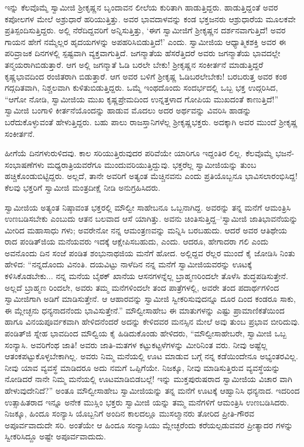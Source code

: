 ಇನ್ನು ಕೆಲವೊಮ್ಮೆ ಸ್ವಾಮೀಜಿ ಶ್ರೀಕೃಷ್ಣನ ಬೃಂದಾವನ ಲೀಲೆಯ ಕುರಿತಾಗಿ ಹಾಡುತ್ತಿದ್ದರು. ಹಾಡುತ್ತಿದ್ದಂತೆ ಅವರ ಕಪೋಲಗಳ ಮೇಲೆ ಅಶ್ರುಧಾರೆ ಹರಿಯುತ್ತಿತ್ತು. ಅವರ ಭಾವದಾಳವನ್ನು ಕಂಡ ಭಕ್ತಜನರು ಆಶ್ರುಧಾರೆಯ ಮೂಲಕವೇ ಪ್ರತಿಸ್ಪಂದಿಸುತ್ತಿದ್ದರು. ಅಲ್ಲಿ ನೆರೆದಿದ್ದವರಿಗೆ ಅನ್ನಿಸುತ್ತಿತ್ತು, ‘ಈಗ ಸ್ವಾಮೀಜಿಗೆ ಶ್ರೀಕೃಷ್ಣನ ದರ್ಶನವಾಗುತ್ತಿದೆ! ಅವರ ಗಾಯನ ಹೇಗೆ ನಮ್ಮೆಲ್ಲರ ಹೃದಯಗಳನ್ನು ಅಪಹರಿಸಿಬಿಡುತ್ತಿದೆ!’ ಎಂದು. ಸ್ವಾಮೀಜಿಯ ಆಧ್ಯಾತ್ಮಿಕಶಕ್ತಿ ಅವರ ಈ ಪರಿವ್ರಾಜಕ ದಿನಗಳಲ್ಲಿ ಸ್ಪಷ್ಟವಾಗಿ ವ್ಯಕ್ತವಾಗುತ್ತಿದೆ. ಜಗನ್ಮಾತೆಯ ಹೆಸರೆತ್ತಿದರೆ ಅವರು ಜಗನ್ಮಾತೆಯ ಭಾವದಲ್ಲೇ ತನ್ಮಯರಾಗಿಬಿಡುತ್ತಾರೆ. ಆಗ ಅಲ್ಲಿ ಜಗನ್ಮಾತೆ ಓಡಿ ಬರಲೇ ಬೇಕು! ಶ್ರೀಕೃಷ್ಣನ ಸಂಕೀರ್ತನೆ ಮಾಡುತ್ತಿದ್ದರೆ ಕೃಷ್ಣಭಾವದಿಂದ ರಂಜಿತರಾಗಿ ಬಿಡುತ್ತಾರೆ. ಆಗ ಅವರ ಬಳಿಗೆ ಶ್ರೀಕೃಷ್ಣ ಓಡಿಬರಲೇಬೇಕು! ಬರಬರುತ್ತ ಅವರ ಕಂಠ ಗದ್ಗದಿತವಾಗಿ, ನಿಶ್ಚಲವಾಗಿ ಕುಳಿತುಬಿಡುತ್ತಿದ್ದರು. ಒಮ್ಮೆ ಇಂಥದೊಂದು ಸಂದರ್ಭದಲ್ಲಿ ಒಬ್ಬ ಭಕ್ತ ಉದ್ಗರಿಸಿದ, “ಆಗೋ ನೋಡಿ, ಸ್ವಾಮೀಜಿಯ ಮುಖ ಕೃಷ್ಣಪ್ರೇಮದಿಂದ ಉನ್ನತ್ತಳಾದ ಗೋಪಿಯ ಮುಖದಂತೆ ಕಾಣುತ್ತಿದೆ!” ಸ್ವಾಮೀಜಿ ಬಂಗಾಳಿ ಕೀರ್ತನೆಯೊಂದನ್ನು ಹಾಡುವ ಮೊದಲು ಅದರ ಅರ್ಥವನ್ನು ವಿವರಿಸಿ ಹಾಡನ್ನು ಬರೆದುಕೊಳ್ಳುವಂತೆ ಹೇಳುತ್ತಿದ್ದರು. ಬಹು ಪಾಲು ರಾಜಸ್ತಾನಿಗಳೆಲ್ಲ ಶ್ರೀಕೃಷ್ಣಭಕ್ತರು. ಅದಕ್ಕಾಗಿ ಅವರ ಮುಂದೆ ಶ್ರೀಕೃಷ್ಣ ಸಂಕೀರ್ತನೆ.

ಹೀಗೆಯೆ ದಿನಗಳುರುಳಿದವು. ಕಾಲ ಸರಿಯುತ್ತಿರುವುದರ ಪರಿವೆಯೇ ಯಾರಿಗೂ ಇದ್ದಂತಿರ ಲಿಲ್ಲ. ಕೆಲವೊಮ್ಮೆ ಭಜನೆ-ಸಂಭಾಷಣೆಗಳು ಮಧ್ಯರಾತ್ರಿಯವರೆಗೂ ಮುಂದುವರಿಯುತ್ತಿದ್ದುವು. ಭಕ್ತರೆಲ್ಲ ಸ್ವಾಮೀಜಿಯನ್ನು ತುಂಬ ಹಚ್ಚಿಕೊಂಡುಬಿಟ್ಟಿದ್ದರು. ಅಲ್ಲದೆ, ತಾನೇ ಅವರಿಗೆ ಅತ್ಯಂತ ಮೆಚ್ಚಿನವನು ಎಂದು ಪ್ರತಿಯೊಬ್ಬನೂ ಭಾವಿಸಲಾರಂಭಿಸಿದ್ದ! ಕೆಲವು ಭಕ್ತರಿಗೆ ಸ್ವಾಮೀಜಿ ಮಂತ್ರದೀಕ್ಷೆ ನೀಡಿ ಅನುಗ್ರಹಿಸಿದರು.

ಸ್ವಾಮೀಜಿಯ ಅತ್ಯಂತ ನಿಷ್ಠಾವಂತ ಭಕ್ತರಲ್ಲಿ ಮೌಲ್ವೀ ಸಾಹೇಬನೂ ಒಬ್ಬನಾಗಿದ್ದ. ಅವರನ್ನು ತನ್ನ ಮನೆಗೆ ಆಮಂತ್ರಿಸಿ ಉಣಬಡಿಸಬೇಕು ಎಂಬುದು ಆತನ ಬಲವಾದ ಆಸೆ ಯಾಗಿತ್ತು. ಅವನು ಚಿಂತಿಸುತ್ತಿದ್ದ–‘ಸ್ವಾಮೀಜಿ ಜಾತಿಭಾವನೆಯನ್ನು ಮೀರಿದ ಮಹಾಸಾಧು ಗಳು; ಅವರೇನೋ ನನ್ನ ಆಮಂತ್ರಣವನ್ನು ಮನ್ನಿಸಿ ಬರಬಹುದು. ಆದರೆ ಅವರ ಆತಿಥೇಯ ರಾದ ಪಂಡಿತ್​ಜಿಯ ಮನೆಯವರು ಇದಕ್ಕೆ ಆಕ್ಷೇಪಿಸಬಹುದು, ಎಂದು. ಆದರೂ, ಹೇಗಾದರಾ ಗಲಿ ಎಂದು ಅವನೊಂದು ದಿನ ಸಂಜೆ ಪಂಡಿತ ಶಂಭುನಾಥಜಿಯ ಮನೆಗೆ ಹೋದ. ಅಲ್ಲಿದ್ದವ ರೆಲ್ಲರ ಮುಂದೆ ಕೈ ಜೋಡಿಸಿ ನಿಂತು ಹೇಳಿದ: “ನನ್ನದೊಂದು ವಿನಂತಿ. ದಯವಿಟ್ಟು ನಾಳೆದಿನ ನನ್ನ ಮನೆಗೆ ಸ್ವಾಮೀಜಿಯವರನ್ನು ಊಟಕ್ಕೆ ಕಳಿಸಿಕೊಡಬೇಕು... ನನ್ನ ಮನೆಯ ಬೈಠಕ್ ಖಾನೆಯ ಆಸನಗಳನ್ನೆಲ್ಲ ಬ್ರಾಹ್ಮಣರಿಂದಲೇ ತೊಳೆಸಿ ಶುದ್ಧಪಡಿಸುತ್ತೇನೆ. ಅಲ್ಲದೆ ಬ್ರಾಹ್ಮಣ ರಿಂದಲೇ, ಅವರು ತಮ್ಮ ಮನೆಗಳಿಂದಲೇ ತಂದ ಪಾತ್ರೆಗಳಲ್ಲಿ, ಅವರೇ ತಂದ ಪದಾರ್ಥಗಳಿಂದ ಸ್ವಾಮೀಜಿಗಾಗಿ ಅಡಿಗೆ ಮಾಡಿಸುತ್ತೇನೆ. ಆ ಆಹಾರವನ್ನು ಸ್ವಾಮೀಜಿ ಸ್ವೀಕರಿಸುವುದನ್ನೂ ದೂರ ದಿಂದ ಕಂಡರೂ ಸಾಕು, ಈ ಮ್ಲೇಚ್ಛನು ಧನ್ಯನಾದನೆಂದು ಭಾವಿಸುತ್ತೇನೆ.” ಮೌಲ್ವೀಸಾಹೇಬ ಈ ಮಾತುಗಳನ್ನು ಎಷ್ಟು ಪ್ರಾಮಾಣಿಕತೆಯಿಂದ ಹಾಗೂ ವಿನಯಪೂರ್ವಕವಾಗಿ ಹೇಳಿದನೆಂದರೆ ಅದನ್ನು ಕೇಳಿದವರ ಮನಸ್ಸಿನ ಮೇಲೆ ಅವು ತುಂಬ ಪ್ರಭಾವ ಬೀರಿದುವು. ಪಂಡಿತ್​ಜಿ ಸ್ನೇಹ ಭಾವದಿಂದ ಮೌಲ್ವಿಯ ಕೈ ಹಿಡಿದುಕೊಂಡು ಹೇಳಿದರು, “ಮೌಲ್ವೀಸಾಹೇಬರೇ, ಸ್ವಾಮೀಜಿ ಒಬ್ಬ ಸಂನ್ಯಾಸಿ. ಅವರಿಗೆಂಥ ಜಾತಿ! ಅವರು ಜಾತಿ-ಮತಗಳ ಕಟ್ಟುಕಟ್ಟಳೆಗಳನ್ನು ಮೀರಿನಿಂತ ವರು. ನೀವು ಅಷ್ಟೆಲ್ಲ ಆತಂಕಪಟ್ಟುಕೊಳ್ಳಬೇಕಾಗಿಲ್ಲ. ಅವರು ನಿಮ್ಮ ಮನೆಯಲ್ಲಿ ಊಟ ಮಾಡುವ ಬಗ್ಗೆ ನನ್ನ ಕಡೆಯಿಂದೇನೂ ಅಭ್ಯಂತರವಿಲ್ಲ. ನೀವು ಯಾವ ವ್ಯವಸ್ಥೆ ಮಾಡಿದರೂ ಅದು ನಮಗೆ ಒಪ್ಪಿಗೆಯೇ. ನಿಜಕ್ಕೂ, ನೀವು ಮಾಡಿಸುತ್ತಿರುವ ವ್ಯವಸ್ಥೆಯನ್ನು ನೋಡಿದರೆ ನಾನೇ ನಿಮ್ಮ ಮನೆಯಲ್ಲಿ ಊಟಮಾಡಿಬಿಡಬಲ್ಲೆ! ಇನ್ನು ಮುಕ್ತಪುರುಷರಾದ ಸ್ವಾಮೀಜಿಯ ವಿಚಾರ ವಾಗಿ ಹೇಳುವುದೇನಿದೆ?” ಅಂತೂ ಮೌಲ್ವೀಸಾಹೇಬ ಸ್ವಾಮೀಜಿಯನ್ನು ತನ್ನ ಮನೆಗೆ ಊಟಕ್ಕೆ ಆಹ್ವಾನಿಸಿ ಧನ್ಯನಾದ. ಇದರಿಂದ ಉತ್ಸಾಹಿತರಾದ ಇನ್ನೂ ಅನೇಕ ಮುಸ್ಲಿಂ ಭಕ್ತರು ಸ್ವಾಮೀಜಿ ಯನ್ನು ತಮ್ಮ ಮನೆಗಳಿಗೆ ಆಮಂತ್ರಿಸಿ ಉಣಬಡಿಸಿದರು. ನಿಜಕ್ಕೂ, ಹಿಂದೂ ಸಂನ್ಯಾಸಿ ಯೊಬ್ಬನಿಗೆ ಅಂದಿನ ಕಾಲದಲ್ಲೂ ಮುಸಲ್ಮಾನರು ತೋರಿದ ಪ್ರೀತಿ-ಗೌರವ ಅಪೂರ್ವವಾದುದೇ ಸರಿ. ಅಂತೆಯೇ ಆ ಹಿಂದೂ ಸಂನ್ಯಾಸಿಯು ಮ್ಲೇಚ್ಛರೆಂದು ಕರೆಯಲ್ಪಡುವವರ ಪ್ರೀತ್ಯಾದರ ಗಳನ್ನು ಸ್ವೀಕರಿಸಿದ್ದೂ ಅಷ್ಟೇ ಅಪೂರ್ವವಾದುದು.

